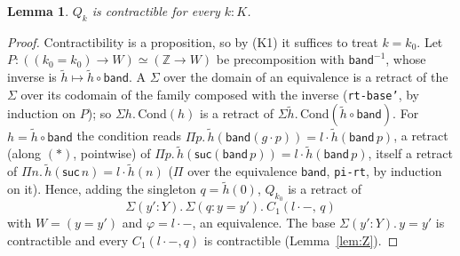 \documentclass[11pt]{amsart}
\newtheorem{lemma}[theorem]{Lemma}
\theoremstyle{definition}
\theoremstyle{remark}
\newcommand{\Z}{\mathbb{Z}}
\newcommand{\code}[1]{\texttt{#1}}
\newcommand{\band}{\mathsf{band}}
\newcommand{\cc}{\cdot}
\begin{document}
\begin{lemma}\label{lem:Q}
$Q_k$ is contractible for every $k:K$.
\end{lemma}
\begin{proof}
Contractibility is a proposition, so by (K1) it suffices to treat
$k=k_0$. Let $P:((k_0=k_0)\to W)\simeq(\Z\to W)$ be precomposition with
$\band^{-1}$, whose inverse is $\tilde h\mapsto\tilde h\circ\band$. A
$\Sigma$ over the domain of an equivalence is a retract of the $\Sigma$ over
its codomain of the family composed with the inverse (\code{rt-base'}, by
induction on $P$); so $\Sigma h.\,\mathrm{Cond}(h)$ is a retract of
$\Sigma\tilde h.\,\mathrm{Cond}(\tilde h\circ\band)$. For $h=\tilde h\circ\band$
the condition reads $\Pi p.\,\tilde h(\band(g\cc p))=l\cc\tilde h(\band\,p)$,
a retract (along $(\ast)$, pointwise) of
$\Pi p.\,\tilde h(\mathsf{suc}(\band\,p))=l\cc\tilde h(\band\,p)$, itself a
retract of $\Pi n.\,\tilde h(\mathsf{suc}\,n)=l\cc\tilde h(n)$ ($\Pi$ over the
equivalence $\band$, \code{pi-rt}, by induction on it). Hence, adding the
singleton $q=\tilde h(0)$, $Q_{k_0}$ is a retract of
\[\Sigma(y':Y).\,\Sigma(q:y=y').\ C_1(l\cc-,\,q)\]
with $W=(y=y')$ and $\varphi=l\cc-$, an equivalence. The base
$\Sigma(y':Y).\,y=y'$ is contractible and every $C_1(l\cc-,q)$ is
contractible (Lemma~\ref{lem:Z}).
\end{proof}
\end{document}
